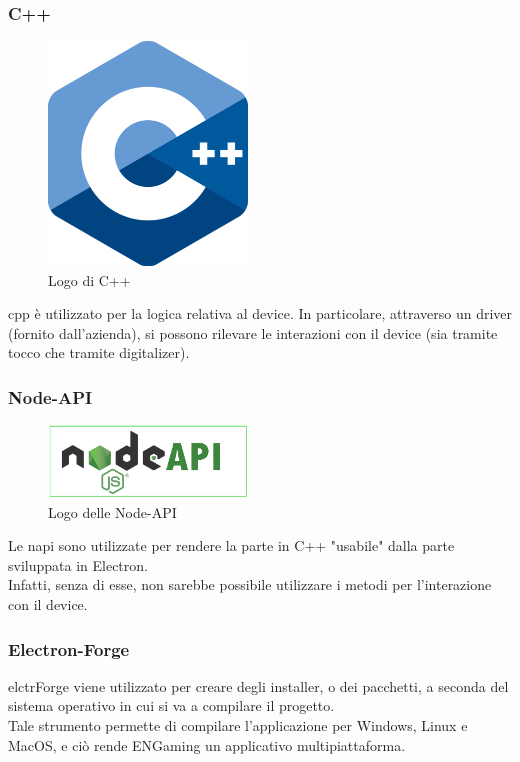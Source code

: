 \subsubsection{C++}
\begin{figure}[h]
    \centering
    \includegraphics[width=150pt]{images/technologies/cpp.png}
    \caption{Logo di C++}
    \label{fig:cpp}
\end{figure}
\gls{cpp} è utilizzato per la logica relativa al device. In particolare, attraverso un driver (fornito dall'azienda), si possono rilevare le interazioni con il device (sia tramite tocco che tramite digitalizer).

\subsubsection{Node-API}
\begin{figure}[h]
    \centering
    \includegraphics[width=150pt]{images/technologies/nodeapi.png}
    \caption{Logo delle Node-API}
    \label{fig:nodeapi}
\end{figure}
Le \gls{napi} sono utilizzate per rendere la parte in C++ "usabile" dalla parte sviluppata in Electron.\\
Infatti, senza di esse, non sarebbe possibile utilizzare i metodi per l'interazione con il device.

\subsubsection{Electron-Forge}
\gls{elctrForge} viene utilizzato per creare degli installer, o dei pacchetti, a seconda del sistema operativo in cui si va a compilare il progetto.\\
Tale strumento permette di compilare l'applicazione per Windows, Linux e MacOS, e ciò rende ENGaming un applicativo multipiattaforma.

